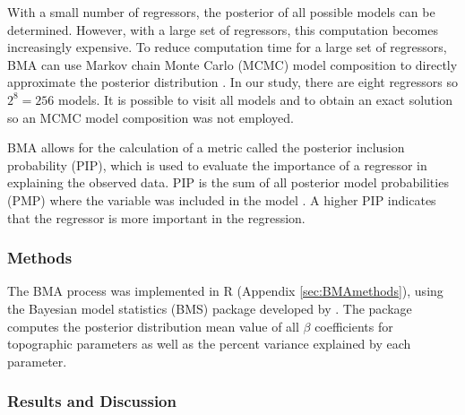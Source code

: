 \documentclass{sfuthesis}
\begin{document}
With a small number of regressors, the posterior of all possible models can be determined. However, with a large set of regressors, this computation becomes increasingly expensive. To reduce computation time for a large set of regressors, BMA can use Markov chain Monte Carlo (MCMC) model composition to directly approximate the posterior distribution \citep{Wasserman2000}. In our study, there are eight regressors so $2^8 = 256$ models. It is possible to visit all models and to obtain an exact solution so an MCMC model composition was not employed. 

BMA allows for the calculation of a metric called the posterior inclusion probability (PIP), which is used to evaluate the importance of a regressor in explaining the observed data. PIP is the sum of all posterior model probabilities (PMP) where the variable was included in the model \citep{Zeugner2015}. A higher PIP indicates that the regressor is more important in the regression.  

\subsubsection{Methods}

The BMA process was implemented in R (Appendix \ref{sec:BMAmethods}), using the Bayesian model statistics (BMS) package developed by \cite{Zeugner2015}. The package computes the posterior distribution mean value of all $\beta$ coefficients for topographic parameters as well as the percent variance explained by each parameter.

\subsubsection{Results and Discussion}
\end{document}
